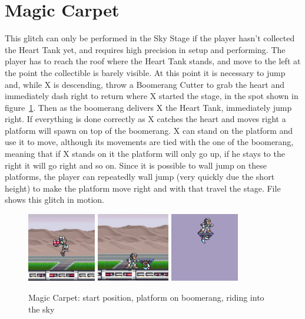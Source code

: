 \section{Magic Carpet}
This glitch can only be performed in the Sky Stage if the player hasn't collected the Heart Tank yet, and requires high precision in setup and performing. The player has to reach the roof where the Heart Tank stands, and move to the left at the point the collectible is barely visible. At this point it is necessary to jump and, while X is descending, throw a Boomerang Cutter to grab the heart and immediately dash right to return where X started the stage, in the spot shown in figure~\ref{fig:carpet}. Then as the boomerang delivers X the Heart Tank, immediately jump right. If everything is done correctly as X catches the heart and moves right a platform will spawn on top of the boomerang. X can stand on the platform and use it to move, although its movements are tied with the one of the boomerang, meaning that if X stands on it the platform will only go up, if he stays to the right it will go right and so on. Since it is possible to wall jump on these platforms, the player can repeatedly wall jump (very quickly due the short height) to make the platform move right and with that travel the stage. File  shows this glitch in motion. 
 
 \begin{figure}[htp]
 	\centering
 	\includegraphics[height=3cm]{figures/X1/Miscs/Magic_carpet_1.png}
 	\includegraphics[height=3cm]{figures/X1/Miscs/Magic_carpet_2.png}
 	\includegraphics[height=3cm]{figures/X1/Miscs/Magic_carpet_3.png}
 	\caption{Magic Carpet: start position, platform on boomerang, riding into the sky}
 	\label{fig:carpet}
 \end{figure}

